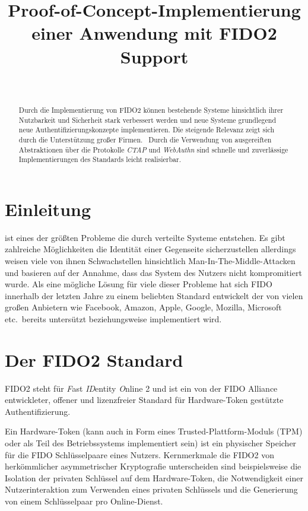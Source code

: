 \documentclass[journal]{IEEEtran}
\title{Proof-of-Concept-Implementierung einer Anwendung mit FIDO2 Support}
\author{
	\IEEEauthorblockN{Mara Schulke \textit{(Matrikel-Nr. 20215853)}}\\
	\IEEEauthorblockA{
		Technische Hochschule Brandenburg \\
		B.Sc. IT Sicherheit \\
		Hardware Sicherheit
	}
}
\begin{document}

\maketitle

\begin{abstract}
	Durch die Implementierung von FIDO2 können bestehende Systeme hinsichtlich
	ihrer Nutzbarkeit und Sicherheit stark verbessert werden und neue Systeme
	grundlegend neue Authentifizierungskonzepte implementieren. Die steigende
	Relevanz zeigt sich durch die Unterstützung großer
	Firmen.~\cite{fidomembers} Durch die Verwendung von ausgereiften
	Abstraktionen über die Protokolle \textit{CTAP} und \textit{WebAuthn} sind
	schnelle und zuverlässige Implementierungen des Standards leicht
	realisierbar.
\end{abstract}

\section{Einleitung}
 ist eines der größten
Probleme die durch verteilte Systeme entstehen. Es gibt zahlreiche
Möglichkeiten die Identität einer Gegenseite sicherzustellen allerdings weisen
viele von ihnen Schwachstellen hinsichtlich Man-In-The-Middle-Attacken und
basieren auf der Annahme, dass das System des Nutzers nicht kompromitiert
wurde. Als eine mögliche Lösung für viele dieser Probleme hat sich FIDO
innerhalb der letzten Jahre zu einem beliebten Standard entwickelt der von
vielen großen Anbietern wie Facebook, Amazon, Apple, Google, Mozilla,
Microsoft etc.\ bereits untersützt beziehungsweise implementiert
wird.~\cite{fidomembers}

\section{Der FIDO2 Standard}

FIDO2 steht für \textit{F}ast \textit{ID}entity \textit{O}nline 2 und ist ein von
der FIDO Alliance entwickleter, offener und lizenzfreier Standard für
Hardware-Token gestützte Authentifizierung.

Ein Hardware-Token (kann auch in Form eines Trusted-Plattform-Moduls (TPM) oder
als Teil des Betriebssystems implementiert sein) ist ein physischer Speicher
für die FIDO Schlüsselpaare eines Nutzers. Kernmerkmale die FIDO2 von
herkömmlicher asymmetrischer Kryptografie unterscheiden sind beispielsweise die
Isolation der privaten Schlüssel auf dem Hardware-Token, die Notwendigkeit
einer Nutzerinteraktion zum Verwenden eines privaten Schlüssels und die
Generierung von einem Schlüsselpaar pro Online-Dienst.~\cite{ctapspec}
\end{document}
